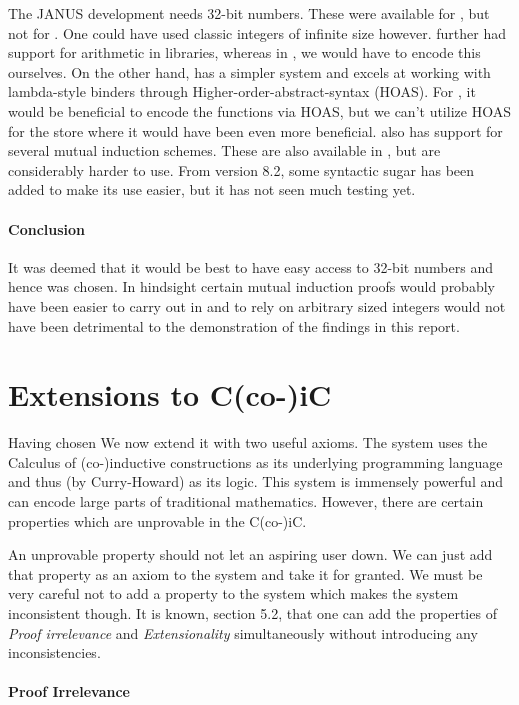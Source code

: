 The JANUS development needs 32-bit numbers. These were available for
\coq{}, but not for \twelf{}. One could have used classic integers of
infinite size however. \coq{} further had support for arithmetic in
libraries, whereas in \twelf{}, we would have to encode this
ourselves. On the other hand, \twelf{} has a simpler system and excels
at working with lambda-style binders through
Higher-order-abstract-syntax (HOAS). For \twelf{}, it would be
beneficial to encode the functions via HOAS, but we can't utilize HOAS
for the store where it would have been even more beneficial. \twelf{}
also has support for several mutual induction schemes. These are also
available in \coq{}, but are considerably harder to use. From \coq{}
version 8.2, some syntactic sugar has been added to make its
use easier, but it has not seen much testing yet.

\paragraph{Conclusion}
It was deemed that it would be best to have easy access to 32-bit
numbers and hence \coq{} was chosen. In hindsight certain mutual
induction proofs would probably have been easier to carry out in
\twelf{} and to rely on arbitrary sized integers would not have been
detrimental to the demonstration of the findings in this report.

\section{Extensions to C(co-)iC}

Having chosen \coq{} We now extend it with two useful axioms. The
system uses the Calculus of (co-)inductive constructions as its
underlying programming language and thus (by Curry-Howard) as its
logic. This system is immensely powerful and can encode large parts of
traditional mathematics. However, there are certain properties which
are unprovable in the C(co-)iC.

An unprovable property should not let an aspiring \coq{} user down. We
can just add that property as an axiom to the system and take it for
granted. We must be very careful not to add a property to the system
which makes the system inconsistent though. It is known,
\cite{team:coq} section 5.2, that one can add the properties of \emph{Proof
  irrelevance} and \emph{Extensionality} simultaneously without
introducing any inconsistencies.

\paragraph{Proof Irrelevance}
\label{sec:proof-irrelevance}

